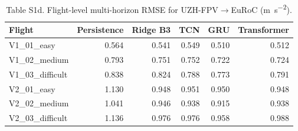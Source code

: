 \documentclass[11pt]{article}
\begin{document}
\begin{table}[htbp]\centering
\caption*{Table S1d. Flight-level multi-horizon RMSE for UZH-FPV$\rightarrow$EuRoC (\si{\metre\per\second\squared}).}
\scriptsize
\begin{tabular}{p{}rrrrr}
\toprule
Flight & Persistence & Ridge B3 & TCN & GRU & Transformer\\
\midrule
V1\_01\_easy & 0.564 & 0.541 & 0.549 & 0.510 & 0.512 \\
V1\_02\_medium & 0.793 & 0.751 & 0.752 & 0.722 & 0.724 \\
V1\_03\_difficult & 0.838 & 0.824 & 0.788 & 0.773 & 0.791 \\
V2\_01\_easy & 1.130 & 0.948 & 0.951 & 0.950 & 0.948 \\
V2\_02\_medium & 1.041 & 0.946 & 0.938 & 0.915 & 0.938 \\
V2\_03\_difficult & 1.136 & 0.976 & 0.976 & 0.958 & 0.988 \\
\bottomrule
\end{tabular}
\end{table}
\end{document}
